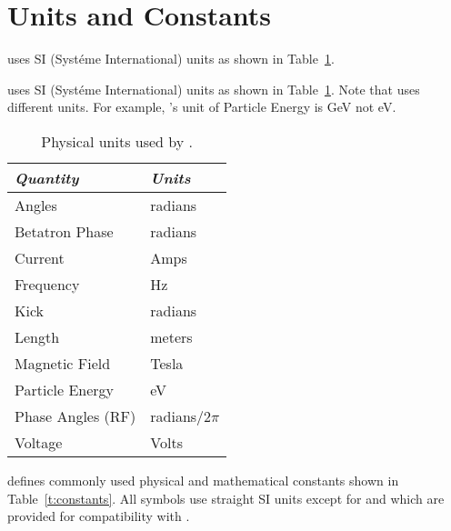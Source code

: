 \section{Units and Constants}
\label{s:constants}

\bmad uses SI (Syst\'eme International) units as shown in
Table~\ref{t:units}.

\bmad uses SI (Syst\'eme International) units as shown in
Table~\ref{t:units}.  Note that \mad uses different units. For example,
\mad's unit of Particle Energy is GeV not eV.
\begin{table}[ht]
\centering
\begin{tabular}{|l|l|} \hline
  {\em Quantity}     & {\em Units}       \\ \hline
  Angles             &    radians        \\ 
  Betatron Phase     &    radians        \\
  Current            &    Amps           \\ 
  Frequency          &    Hz             \\ 
  Kick               &    radians        \\ 
  Length             &    meters         \\ 
  Magnetic Field     &    Tesla          \\ 
  Particle Energy    &    eV             \\ 
  Phase Angles (RF)  &    radians/2$\pi$ \\ 
  Voltage            &    Volts          \\ \hline
\end{tabular}
\caption{Physical units used by \bmad.}
\label{t:units}
\end{table}

\bmad defines commonly used physical and mathematical constants
shown in Table~\ref{t:constants}.  All symbols use straight SI units
except for  and  which are provided for
compatibility with \mad.

